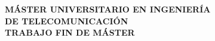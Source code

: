 \pagestyle{empty}

\vspace*{5.5cm}

\begin{center}
    {\Large\textbf{ MÁSTER UNIVERSITARIO EN INGENIERÍA \\DE TELECOMUNICACIÓN \\}}
    \vspace{0.5cm}
    {\Large \textbf{TRABAJO FIN DE MÁSTER}} \\
    \vspace{2.5cm}
    {\Large\textbf{\tfgtitle \\}}
    	    \vspace{0.5cm}
    \vfill
    {\Large\textbf{\MakeUppercase{\authorname}}} \\
    {\Large \textbf{\MakeUppercase{\fecha}}}
    \vspace{4.0cm}
\end{center}

